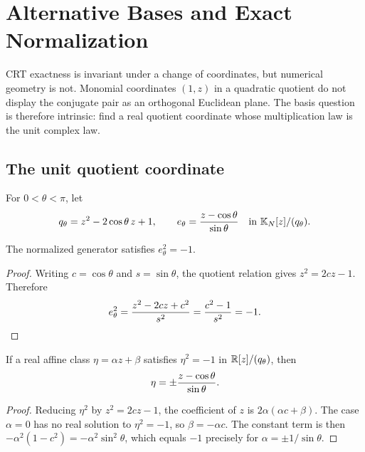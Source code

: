 \section{Alternative Bases and Exact Normalization}
\label{sec:normalized}

CRT exactness is invariant under a change of coordinates, but numerical
geometry is not.  Monomial coordinates $(1,z)$ in a quadratic quotient do not
display the conjugate pair as an orthogonal Euclidean plane.  The basis question
is therefore intrinsic: find a real quotient coordinate whose multiplication
law is the unit complex law.

\subsection{The unit quotient coordinate}

For $0<\theta<\pi$, let
\begin{equation}
 q_\theta=z^2-2\cos\theta\,z+1,
 \qquad
 e_\theta={z-\cos\theta\over\sin\theta}
 \quad\text{in }\mathbb{K}_N[z]/(q_\theta).
 \label{eq:normalized-generator}
\end{equation}

\begin{lemma}
The normalized generator satisfies $e_\theta^2=-1$.
\end{lemma}
\begin{proof}
Writing $c=\cos\theta$ and $s=\sin\theta$, the quotient relation gives
$z^2=2cz-1$.  Therefore
\[
 e_\theta^2={z^2-2cz+c^2\over s^2}
 ={c^2-1\over s^2}=-1.
\]
\end{proof}

\begin{proposition}
If a real affine class $\eta=\alpha z+\beta$ satisfies
$\eta^2=-1$ in $\mathbb{R}[z]/(q_\theta)$, then
\begin{equation}
 \eta=\pm{z-\cos\theta\over\sin\theta}.
 \label{eq:affine-generator-unique}
\end{equation}
\end{proposition}
\begin{proof}
Reducing $\eta^2$ by $z^2=2cz-1$, the coefficient of $z$ is
$2\alpha(\alpha c+\beta)$.  The case $\alpha=0$ has no real solution to
$\eta^2=-1$, so $\beta=-\alpha c$.  The constant term is then
$-\alpha^2(1-c^2)=-\alpha^2\sin^2\theta$, which equals $-1$ precisely for
$\alpha=\pm1/\sin\theta$.
\end{proof}

